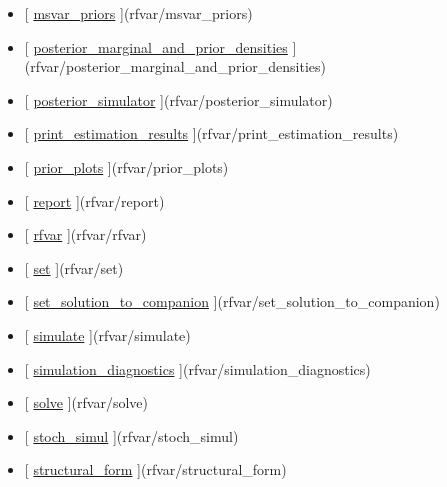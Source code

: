 \documentclass[letterpaper,10pt,english]{sphinxmanual}
\begin{document}
\begin{itemize}
\item {} 
{[} {\hyperref[classes/models/@rfvar/rfvar:msvar-priors]{msvar\_priors}} {]}(rfvar/msvar\_priors)

\item {} 
{[} {\hyperref[classes/models/@rfvar/rfvar:posterior-marginal-and-prior-densities]{posterior\_marginal\_and\_prior\_densities}} {]}(rfvar/posterior\_marginal\_and\_prior\_densities)

\item {} 
{[} {\hyperref[classes/models/@rfvar/rfvar:posterior-simulator]{posterior\_simulator}} {]}(rfvar/posterior\_simulator)

\item {} 
{[} {\hyperref[classes/models/@rfvar/rfvar:print-estimation-results]{print\_estimation\_results}} {]}(rfvar/print\_estimation\_results)

\item {} 
{[} {\hyperref[classes/models/@rfvar/rfvar:prior-plots]{prior\_plots}} {]}(rfvar/prior\_plots)

\item {} 
{[} {\hyperref[classes/models/@rfvar/rfvar:report]{report}} {]}(rfvar/report)

\item {} 
{[} {\hyperref[classes/models/@rfvar/rfvar:rfvar]{rfvar}} {]}(rfvar/rfvar)

\item {} 
{[} {\hyperref[classes/models/@rfvar/rfvar:set]{set}} {]}(rfvar/set)

\item {} 
{[} {\hyperref[classes/models/@rfvar/rfvar:set-solution-to-companion]{set\_solution\_to\_companion}} {]}(rfvar/set\_solution\_to\_companion)

\item {} 
{[} {\hyperref[classes/models/@rfvar/rfvar:simulate]{simulate}} {]}(rfvar/simulate)

\item {} 
{[} {\hyperref[classes/models/@rfvar/rfvar:simulation-diagnostics]{simulation\_diagnostics}} {]}(rfvar/simulation\_diagnostics)

\item {} 
{[} {\hyperref[classes/models/@rfvar/rfvar:solve]{solve}} {]}(rfvar/solve)

\item {} 
{[} {\hyperref[classes/models/@rfvar/rfvar:stoch-simul]{stoch\_simul}} {]}(rfvar/stoch\_simul)

\item {} 
{[} {\hyperref[classes/models/@rfvar/rfvar:structural-form]{structural\_form}} {]}(rfvar/structural\_form)


\end{itemize}
\end{document}
